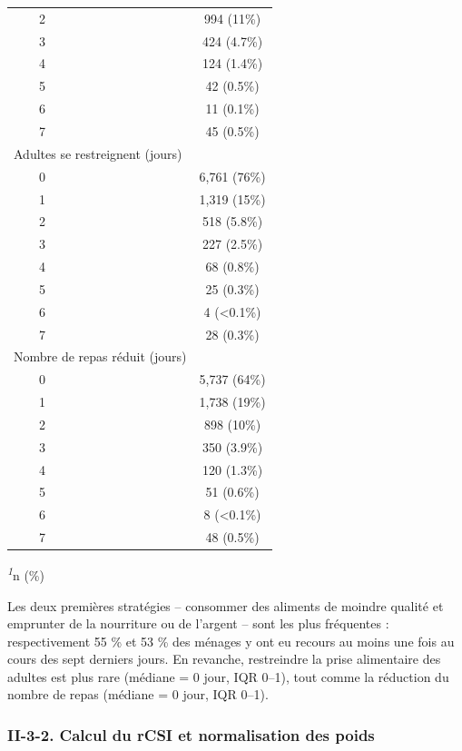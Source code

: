 \documentclass[
]{article}
\begin{document}
\begin{table}[!t]
\begin{tabular*}{\linewidth}{@{\extracolsep{\fill}}lc}
    2 & 994 (11\%) \\ 
    3 & 424 (4.7\%) \\ 
    4 & 124 (1.4\%) \\ 
    5 & 42 (0.5\%) \\ 
    6 & 11 (0.1\%) \\ 
    7 & 45 (0.5\%) \\ 
Adultes se restreignent (jours) &  \\ 
    0 & 6,761 (76\%) \\ 
    1 & 1,319 (15\%) \\ 
    2 & 518 (5.8\%) \\ 
    3 & 227 (2.5\%) \\ 
    4 & 68 (0.8\%) \\ 
    5 & 25 (0.3\%) \\ 
    6 & 4 (<0.1\%) \\ 
    7 & 28 (0.3\%) \\ 
Nombre de repas réduit (jours) &  \\ 
    0 & 5,737 (64\%) \\ 
    1 & 1,738 (19\%) \\ 
    2 & 898 (10\%) \\ 
    3 & 350 (3.9\%) \\ 
    4 & 120 (1.3\%) \\ 
    5 & 51 (0.6\%) \\ 
    6 & 8 (<0.1\%) \\ 
    7 & 48 (0.5\%) \\ 
\bottomrule
\end{tabular*}
\begin{minipage}{\linewidth}
\textsuperscript{\textit{1}}n (\%)\\
\end{minipage}
\end{table}

Les deux premières stratégies -- consommer des aliments de moindre
qualité et emprunter de la nourriture ou de l'argent -- sont les plus
fréquentes : respectivement 55 \% et 53 \% des ménages y ont eu recours
au moins une fois au cours des sept derniers jours. En revanche,
restreindre la prise alimentaire des adultes est plus rare (médiane = 0
jour, IQR 0--1), tout comme la réduction du nombre de repas (médiane = 0
jour, IQR 0--1).

\hypertarget{ii-3-2.-calcul-du-rcsi-et-normalisation-des-poids}{%
\subsubsection{II-3-2. Calcul du rCSI et normalisation des
poids}\label{ii-3-2.-calcul-du-rcsi-et-normalisation-des-poids}}
\end{document}
